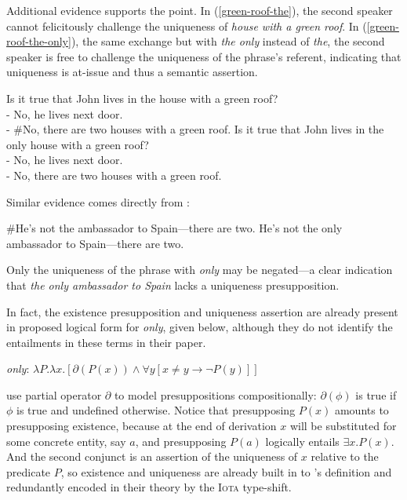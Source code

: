 Additional evidence supports the point. In (\ref{green-roof-the}), the second speaker cannot felicitously challenge the uniqueness of \textit{house with a green roof}. In (\ref{green-roof-the-only}), the same exchange but with \textit{the only} instead of \textit{the}, the second speaker is free to challenge the uniqueness of the phrase's referent, indicating that uniqueness is at-issue and thus a semantic assertion.

\begin{exe}
	\ex \label{green-roof-the} Is it true that John lives in the house with a green roof? \\
	    - No, he lives next door. \\
	    - \#No, there are two houses with a green roof.
	\ex \label{green-roof-the-only} Is it true that John lives in the only house with a green roof? \\
	    - No, he lives next door. \\
	    - No, there are two houses with a green roof.
\end{exe}

Similar evidence comes directly from \citet{cb2015}:

\begin{exe}
	\ex \#He's not the ambassador to Spain---there are two.
	\ex He's not the only ambassador to Spain---there are two.
\end{exe}

Only the uniqueness of the phrase with \textit{only} may be negated---a clear indication that \textit{the only ambassador to Spain} lacks a uniqueness presupposition.

In fact, the existence presupposition and uniqueness assertion are already present in  proposed logical form for \textit{only}, given below, although they do not identify the entailments in these terms in their paper.

\begin{exe}
	\ex \label{only-lf} \textit{only}: $ \lambda P . \lambda x . [ \partial(P(x)) \land \forall y [ x \ne y \to \neg P(y) ] ] $
\end{exe}

\citeauthor{cb2015} use  partial operator $\partial$ to model presuppositions compositionally: $\partial(\phi)$ is true if $\phi$ is true and undefined otherwise. Notice that presupposing $P(x)$ amounts to presupposing existence, because at the end of derivation $x$ will be substituted for some concrete entity, say $a$, and presupposing $P(a)$ logically entails $\exists x . P(x)$. And the second conjunct is an assertion of the uniqueness of $x$ relative to the predicate $P$, so existence and uniqueness are already built in to \citeauthor{cb2015}'s definition and redundantly encoded in their theory by the \textsc{Iota} type-shift.

